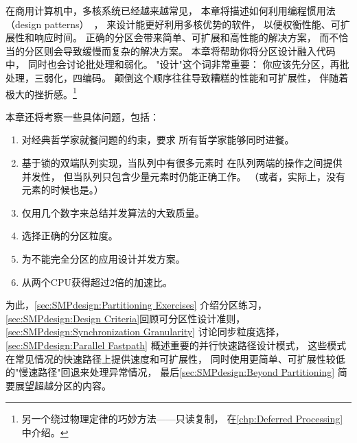 
%

在商用计算机中，多核系统已经越来越常见，
本章将描述如何利用编程惯用法（design patterns）~\cite{Alexander79,GOF95,SchmidtStalRohnertBuschmann2000v2Textbook}，
来设计能更好利用多核优势的软件，
以便权衡性能、可扩展性和响应时间。
正确的分区会带来简单、可扩展和高性能的解决方案，
而不恰当的分区则会导致缓慢而复杂的解决方案。
本章将帮助你将分区设计融入代码中，
同时也会讨论批处理和弱化。
"设计"这个词非常重要：
你应该先分区，再批处理，三弱化，四编码。
颠倒这个顺序往往导致糟糕的性能和可扩展性，
伴随着极大的挫折感。\footnote{
	另一个绕过物理定律的巧妙方法——只读复制，
	在\cref{chp:Deferred Processing}中介绍。}

本章还将考察一些具体问题，包括：

\begin{enumerate}
\item	对经典哲学家就餐问题的约束，要求
	所有哲学家能够同时进餐。
\label{sec:SMPdesign:Problems Dining Philosophers}
\item	基于锁的双端队列实现，当队列中有很多元素时
	在队列两端的操作之间提供并发性，
	但当队列只包含少量元素时仍能正确工作。
	（或者，实际上，没有元素的时候也是。）
\label{sec:SMPdesign:Problems Double-Ended Queue}
\item	仅用几个数字来总结并发算法的大致质量。
\label{sec:SMPdesign:Problems Quality Assessment}
\item	选择正确的分区粒度。
\label{sec:SMPdesign:Problems Granularity}
\item	为不能完全分区的应用设计并发方案。
\label{sec:SMPdesign:Problems Parallel Fastpath}
\item	从两个CPU获得超过2倍的加速比。
\label{sec:SMPdesign:Problems Maze}
\end{enumerate}

为此，\cref{sec:SMPdesign:Partitioning Exercises}
介绍分区练习，
\cref{sec:SMPdesign:Design Criteria}回顾可分区性设计准则，
\cref{sec:SMPdesign:Synchronization Granularity}
讨论同步粒度选择，
\cref{sec:SMPdesign:Parallel Fastpath}
概述重要的并行快速路径设计模式，
这些模式在常见情况的快速路径上提供速度和可扩展性，
同时使用更简单、可扩展性较低的"慢速路径"回退来处理异常情况，
最后\cref{sec:SMPdesign:Beyond Partitioning}
简要展望超越分区的内容。




